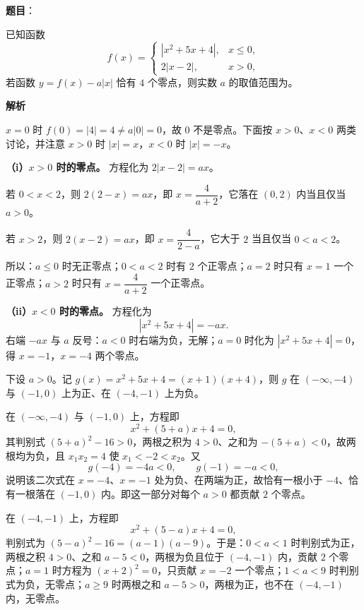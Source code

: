 \begin{answer}

\textbf{题目}：

已知函数
\nopagebreak[4]
\[f(x)=\begin{cases}
|x^2+5x+4|, & x\leqslant 0,\\
2|x-2|, & x>0,
\end{cases}\]
若函数 $y=f(x)-a|x|$ 恰有 $4$ 个零点，则实数 $a$ 的取值范围为\gkblank{}。

\textbf{解析}

$x=0$ 时 $f(0)=|4|=4\neq a|0|=0$，故 $0$ 不是零点。下面按 $x>0$、$x<0$ 两类讨论，并注意 $x>0$ 时 $|x|=x$，$x<0$ 时 $|x|=-x$。

\textbf{（i）$x>0$ 时的零点。} 方程化为 $2|x-2|=ax$。

若 $0<x<2$，则 $2(2-x)=ax$，即 $x=\dfrac{4}{a+2}$，它落在 $(0,2)$ 内当且仅当 $a>0$。

若 $x>2$，则 $2(x-2)=ax$，即 $x=\dfrac{4}{2-a}$，它大于 $2$ 当且仅当 $0<a<2$。

所以：$a\leqslant 0$ 时无正零点；$0<a<2$ 时有 $2$ 个正零点；$a=2$ 时只有 $x=1$ 一个正零点；$a>2$ 时只有 $x=\dfrac{4}{a+2}$ 一个正零点。

\textbf{（ii）$x<0$ 时的零点。} 方程化为
\nopagebreak[4]
\[|x^2+5x+4|=-ax.\]
右端 $-ax$ 与 $a$ 反号：$a<0$ 时右端为负，无解；$a=0$ 时化为 $|x^2+5x+4|=0$，得 $x=-1$，$x=-4$ 两个零点。

下设 $a>0$。记 $g(x)=x^2+5x+4=(x+1)(x+4)$，则 $g$ 在 $(-\infty,-4)$ 与 $(-1,0)$ 上为正、在 $(-4,-1)$ 上为负。

在 $(-\infty,-4)$ 与 $(-1,0)$ 上，方程即
\nopagebreak[4]
\[x^2+(5+a)x+4=0,\]
其判别式 $(5+a)^2-16>0$，两根之积为 $4>0$、之和为 $-(5+a)<0$，故两根均为负，且 $x_1x_2=4$ 使 $x_1<-2<x_2$。又
\nopagebreak[4]
\[g(-4)=-4a<0,\qquad g(-1)=-a<0,\]
说明该二次式在 $x=-4$、$x=-1$ 处为负、在两端为正，故恰有一根小于 $-4$、恰有一根落在 $(-1,0)$ 内。即这一部分对每个 $a>0$ 都贡献 $2$ 个零点。

在 $(-4,-1)$ 上，方程即
\nopagebreak[4]
\[x^2+(5-a)x+4=0,\]
判别式为 $(5-a)^2-16=(a-1)(a-9)$。于是：$0<a<1$ 时判别式为正，两根之积 $4>0$、之和 $a-5<0$，两根为负且位于 $(-4,-1)$ 内，贡献 $2$ 个零点；$a=1$ 时方程为 $(x+2)^2=0$，只贡献 $x=-2$ 一个零点；$1<a<9$ 时判别式为负，无零点；$a\geqslant 9$ 时两根之和 $a-5>0$，两根为正，也不在 $(-4,-1)$ 内，无零点。


\end{answer}
